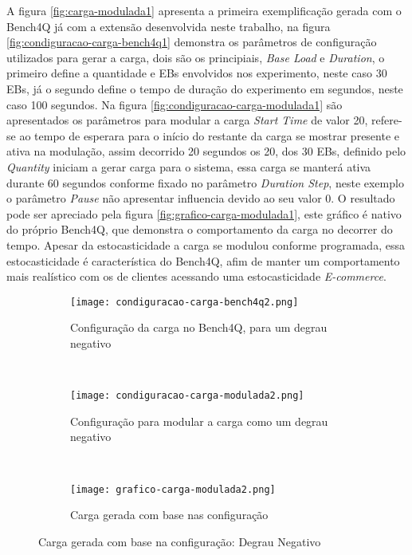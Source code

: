 A figura \ref{fig:carga-modulada1} apresenta a primeira exemplificação gerada com o Bench4Q já com a extensão desenvolvida neste trabalho, na figura \ref{fig:condiguracao-carga-bench4q1} demonstra os parâmetros de configuração utilizados para gerar a carga, dois são os principiais, \textit{Base Load} e \textit{Duration}, o primeiro define a quantidade e EBs envolvidos nos experimento, neste caso 30 EBs, já o segundo define o tempo de duração do experimento em segundos, neste caso 100 segundos. Na figura \ref{fig:condiguracao-carga-modulada1} são apresentados os parâmetros para modular a carga \textit{Start Time} de valor 20, refere-se ao tempo de esperara para o início do restante da carga se mostrar presente e ativa na modulação, assim decorrido 20 segundos os 20, dos 30 EBs, definido pelo \textit{Quantity} iniciam a gerar carga para o sistema, essa carga se manterá ativa durante 60 segundos conforme fixado no parâmetro \textit{Duration Step}, neste exemplo o parâmetro \textit{Pause} não apresentar influencia devido ao seu valor 0.
O resultado pode ser apreciado pela figura \ref{fig:grafico-carga-modulada1}, este gráfico é nativo do próprio Bench4Q, que demonstra o comportamento da carga no decorrer do tempo. Apesar da estocasticidade a carga se modulou conforme programada, essa estocasticidade é característica do Bench4Q, afim de manter um comportamento mais realístico com os de clientes acessando uma estocasticidade \textit{E-commerce}.

\begin{figure}[!htb]
	\begin{subfigure}{\linewidth}
		\centering
		\texttt{[image: condiguracao-carga-bench4q2.png]}
		\caption{Configuração da carga no Bench4Q, para um degrau negativo}
		\label{fig:condiguracao-carga-bench4q2}
	\end{subfigure}\\
	\begin{subfigure}{\linewidth}
		\centering
		\texttt{[image: condiguracao-carga-modulada2.png]}
		\caption{Configuração para modular a carga como um degrau negativo}
		\label{fig:condiguracao-carga-modulada2}
	\end{subfigure}\\[1ex]
	\begin{subfigure}{\linewidth}
		\centering
		\texttt{[image: grafico-carga-modulada2.png]}
		\caption{Carga gerada com base nas configuração}
		\label{fig:grafico-carga-modulada2}
	\end{subfigure}
	\caption{Carga gerada com base na configuração: Degrau Negativo}
	\label{fig:carga-modulada2}
	\fautor
\end{figure}


